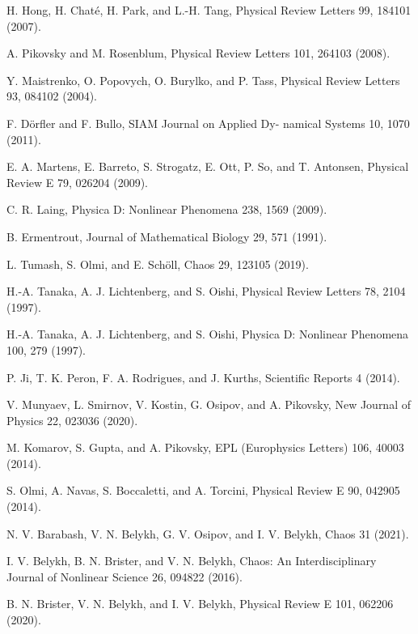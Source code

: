 \documentclass[a4paper,12pt, titlepage]{report} %
\theoremstyle{plain}
\begin{document}
\begin{thebibliography}{10}
    H. Hong, H. Chaté, H. Park, and L.-H. Tang, Physical Review Letters 99, 184101 (2007).

    A. Pikovsky and M. Rosenblum, Physical Review Letters 101, 264103 (2008).

    Y. Maistrenko, O. Popovych, O. Burylko, and P. Tass, Physical Review Letters 93, 084102 (2004).

    F. Dörfler and F. Bullo, SIAM Journal on Applied Dy- namical Systems 10, 1070 (2011).

    E. A. Martens, E. Barreto, S. Strogatz, E. Ott, P. So, and T. Antonsen, Physical Review E 79, 026204 (2009).

    C. R. Laing, Physica D: Nonlinear Phenomena 238, 1569 (2009).
    
    B. Ermentrout, Journal of Mathematical Biology 29, 571 (1991).

    L. Tumash, S. Olmi, and E. Schöll, Chaos 29, 123105 (2019).

    H.-A. Tanaka, A. J. Lichtenberg, and S. Oishi, Physical Review Letters 78, 2104 (1997).

    H.-A. Tanaka, A. J. Lichtenberg, and S. Oishi, Physica D: Nonlinear Phenomena 100, 279 (1997).

    P. Ji, T. K. Peron, F. A. Rodrigues, and J. Kurths, Scientific Reports 4 (2014).

    V. Munyaev, L. Smirnov, V. Kostin, G. Osipov, and A. Pikovsky, New Journal of Physics 22, 023036 (2020).
    
    M. Komarov, S. Gupta, and A. Pikovsky, EPL (Europhysics Letters) 106, 40003 (2014).

    S. Olmi, A. Navas, S. Boccaletti, and A. Torcini, Physical Review E 90, 042905 (2014).
    
    N. V. Barabash, V. N. Belykh, G. V. Osipov, and I. V. Belykh, Chaos 31 (2021).

    I. V. Belykh, B. N. Brister, and V. N. Belykh, Chaos: An Interdisciplinary Journal of Nonlinear Science 26, 094822 (2016).

    B. N. Brister, V. N. Belykh, and I. V. Belykh, Physical Review E 101, 062206 (2020).


\end{thebibliography}
\end{document}
